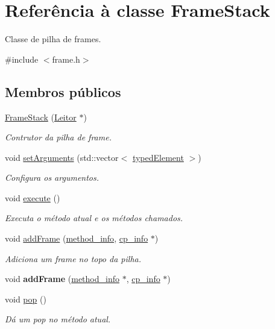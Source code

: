 \hypertarget{classFrameStack}{}\section{Referência à classe Frame\+Stack}
\label{classFrameStack}


Classe de pilha de frames.  




{\ttfamily \#include $<$frame.\+h$>$}

\subsection*{Membros públicos}
\begin{DoxyCompactItemize}
\item 
\hyperlink{classFrameStack_aaa727d2a58e24e6f02f1cd358a804981}{Frame\+Stack} (\hyperlink{classLeitor}{Leitor} $\ast$)
\begin{DoxyCompactList}\small\item\em Contrutor da pilha de frame. \end{DoxyCompactList}\item 
void \hyperlink{classFrameStack_af06f3e125bea380e017afd14fb6b14a3}{set\+Arguments} (std\+::vector$<$ \hyperlink{structtypedElement__s}{typed\+Element} $>$)
\begin{DoxyCompactList}\small\item\em Configura os argumentos. \end{DoxyCompactList}\item 
\mbox{\label{classFrameStack_a9ad510705082a0055eb03e9cbea295f3}} 
void \hyperlink{classFrameStack_a9ad510705082a0055eb03e9cbea295f3}{execute} ()
\begin{DoxyCompactList}\small\item\em Executa o método atual e os métodos chamados. \end{DoxyCompactList}\item 
void \hyperlink{classFrameStack_aefe44d87f18ddf549ca64416569f7a40}{add\+Frame} (\hyperlink{structmethod__info}{method\+\_\+info}, \hyperlink{structcp__info}{cp\+\_\+info} $\ast$)
\begin{DoxyCompactList}\small\item\em Adiciona um frame no topo da pilha. \end{DoxyCompactList}\item 
\mbox{\label{classFrameStack_a84bdb9bfff23f213df4948bcba469a89}} 
void {\bfseries add\+Frame} (\hyperlink{structmethod__info}{method\+\_\+info} $\ast$, \hyperlink{structcp__info}{cp\+\_\+info} $\ast$)
\item 
\mbox{\label{classFrameStack_a7da31bde9fe2f7cf6a4e2497445223a5}} 
void \hyperlink{classFrameStack_a7da31bde9fe2f7cf6a4e2497445223a5}{pop} ()
\begin{DoxyCompactList}\small\item\em Dá um pop no método atual. \end{DoxyCompactList}\end{DoxyCompactItemize}


